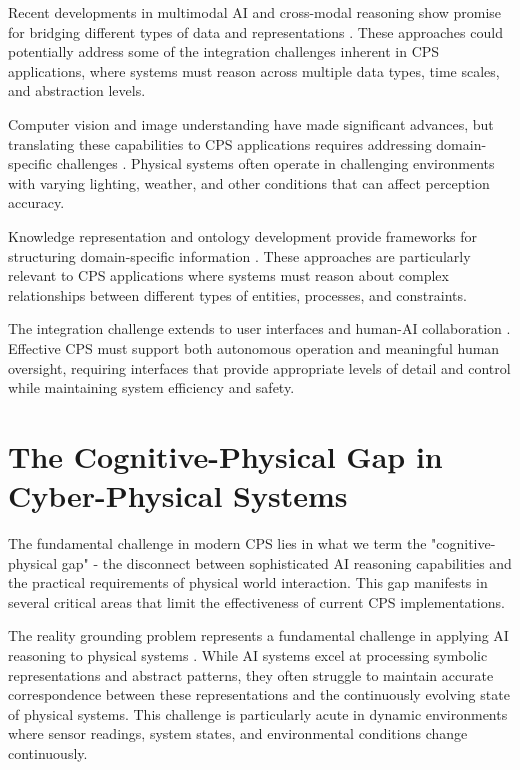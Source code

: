 Recent developments in multimodal AI and cross-modal reasoning show promise for bridging different types of data and representations \cite{baltrusaitis2018multimodal, ramesh2021zero}. These approaches could potentially address some of the integration challenges inherent in CPS applications, where systems must reason across multiple data types, time scales, and abstraction levels.

Computer vision and image understanding have made significant advances, but translating these capabilities to CPS applications requires addressing domain-specific challenges \cite{smeulders2000content, datta2008image}. Physical systems often operate in challenging environments with varying lighting, weather, and other conditions that can affect perception accuracy.

Knowledge representation and ontology development provide frameworks for structuring domain-specific information \cite{gruber1993translation, studer1998knowledge}. These approaches are particularly relevant to CPS applications where systems must reason about complex relationships between different types of entities, processes, and constraints.

The integration challenge extends to user interfaces and human-AI collaboration \cite{negri2017review, kritzinger2018digital}. Effective CPS must support both autonomous operation and meaningful human oversight, requiring interfaces that provide appropriate levels of detail and control while maintaining system efficiency and safety.

\section{The Cognitive-Physical Gap in Cyber-Physical Systems}

The fundamental challenge in modern CPS lies in what we term the "cognitive-physical gap" - the disconnect between sophisticated AI reasoning capabilities and the practical requirements of physical world interaction. This gap manifests in several critical areas that limit the effectiveness of current CPS implementations.

The reality grounding problem represents a fundamental challenge in applying AI reasoning to physical systems \cite{pearl2019seven}. While AI systems excel at processing symbolic representations and abstract patterns, they often struggle to maintain accurate correspondence between these representations and the continuously evolving state of physical systems. This challenge is particularly acute in dynamic environments where sensor readings, system states, and environmental conditions change continuously.

